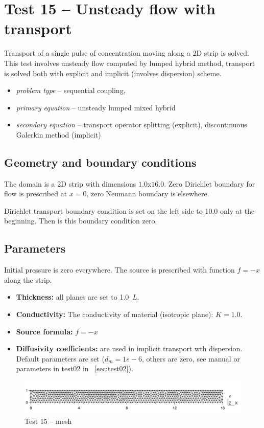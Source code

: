 \section{Test 15 -- Unsteady flow with transport}
Transport of a single pulse of concentration moving along a 2D strip is solved. This test involves unsteady flow computed by lumped hybrid method, transport is solved both with explicit and implicit (involves dispersion) scheme.
 
\begin{itemize} 
    \item \emph{problem type} -- sequential coupling, 
    \item \emph{primary equation} -- unsteady lumped mixed hybrid
    \item \emph{secondary equation} -- transport operator splitting (explicit), discontinuous Galerkin method (implicit)
  \end{itemize}

\subsection*{Geometry and boundary conditions}
The domain is a 2D strip with dimensions $1.0$x$16.0$. Zero Dirichlet boundary for flow is prescribed at $x=0$, zero Neumann boundary is elsewhere. 

Dirichlet transport boundary condition is set on the left side to 10.0 only at the beginning. Then is this boundary condition zero.

\subsection*{Parameters}
Initial pressure is zero everywhere. 
The source is prescribed with function $f=-x$ along the strip.
%
\begin{itemize}
  \item \textbf{Thickness:} all planes are set to 1.0~$L$.
  \item \textbf{Conductivity:} The conductivity of material (isotropic plane): $K=1.0$.
  \item \textbf{Source formula:} $f = -x$
  \item \textbf{Diffusivity coefficients:} are used in implicit transport wth dispersion. 
	Default parameters are set ($d_m=1e-6$, others are zero, see manual or parameters in test02 in ~\ref{sec:test02}).
\end{itemize}
%
\begin{figure}[htb!]
\centering
\includegraphics[width=15cm]{tests_graphics/15_mesh.pdf}
\caption{Test 15 -- mesh}
\label{fig:test15_mesh}
\end{figure}
%
%
